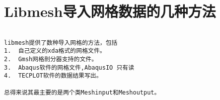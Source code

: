 

\section{Libmesh导入网格数据的几种方法}
\begin{verbatim}

libmesh提供了数种导入网格的方法，包括
1.	自己定义的xda格式的网格文件。
2.	Gmsh网格剖分器支持的文件。
3.	Abaqus软件的网格文件,AbaqusIO 只有读
4.	TECPLOT软件的数据结果写出。

总得来说其最主要的是两个类Meshinput和Meshoutput。
\end{verbatim}

\newpage
